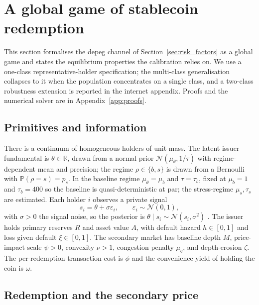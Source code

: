 \section{A global game of stablecoin redemption}\label{sec:model}

This section formalises the depeg channel of Section~\ref{sec:risk_factors} as a global game and states the equilibrium properties the calibration relies on. We use a one-class representative-holder specification; the multi-class generalisation collapses to it when the population concentrates on a single class, and a two-class robustness extension is reported in the internet appendix. Proofs and the numerical solver are in Appendix~\ref{app:proofs}.

\subsection{Primitives and information}\label{sub:model_primitives}

There is a continuum of homogeneous holders of unit mass. The latent issuer fundamental is $\theta \in \mathbb{R}$, drawn from a normal prior $\mathcal{N}(\mu_\theta, 1/\tau)$ with regime-dependent mean and precision; the regime $\rho \in \{b, s\}$ is drawn from a Bernoulli with $\mathbb{P}(\rho=s) = p_s$. In the baseline regime $\mu_\theta = \mu_b$ and $\tau = \tau_b$, fixed at $\mu_b = 1$ and $\tau_b = 400$ so the baseline is quasi-deterministic at par; the stress-regime $\mu_s, \tau_s$ are estimated. Each holder $i$ observes a private signal
\begin{equation}\label{eq:signal}
s_i = \theta + \sigma \varepsilon_i, \qquad \varepsilon_i \sim \mathcal{N}(0,1),
\end{equation}
with $\sigma > 0$ the signal noise, so the posterior is $\theta \mid s_i \sim \mathcal{N}(s_i, \sigma^2)$ \citep{morris_shin_1998}. The issuer holds primary reserves $R$ and asset value $A$, with default hazard $h \in [0,1]$ and loss given default $\xi \in [0,1]$. The secondary market has baseline depth $M$, price-impact scale $\psi > 0$, convexity $\nu > 1$, congestion penalty $\mu_q$, and depth-erosion $\zeta$. The per-redemption transaction cost is $\phi$ and the convenience yield of holding the coin is $\omega$.

\subsection{Redemption and the secondary price}\label{sub:model_secondary}

